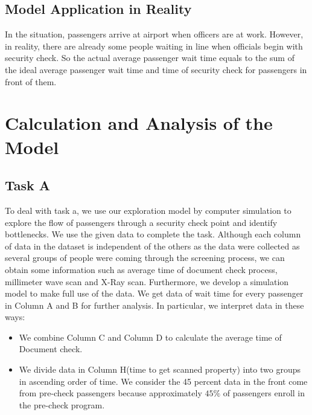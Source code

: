 \documentclass{mcmthesis}
\begin{document}
\subsection*{Model Application in Reality}
\par In the situation, passengers arrive at airport when officers are at work. However, in reality, there are already some people waiting in line when officials begin with security check. So the actual average passenger wait time equals to the sum of the ideal average passenger wait time and time of security check for passengers in front of them.

\section{Calculation and Analysis of the Model}
\subsection{Task A}
\par To deal with task a, we use our exploration model by computer simulation to explore the flow of passengers through a security check point and identify bottlenecks. We use the given data to complete the task. Although each column of data in the dataset is independent of the others as the data were collected as several groups of people were coming through the screening process, we can obtain some information such as average time of document check process, millimeter wave scan and X-Ray scan. Furthermore, we develop a simulation model to make full use of the data. We get data of wait time for every passenger in Column A and B for further analysis. In particular, we interpret data in these ways:
\begin{itemize}
	\item We combine Column C and Column D to calculate the average time of Document check.
	\item We divide data in Column H(time to get scanned property) into two groups in ascending order of time. We consider the 45 percent data in the front come from pre-check passengers because approximately $45\%$ of passengers enroll in the pre-check program. 
\end{itemize}
\end{document}
